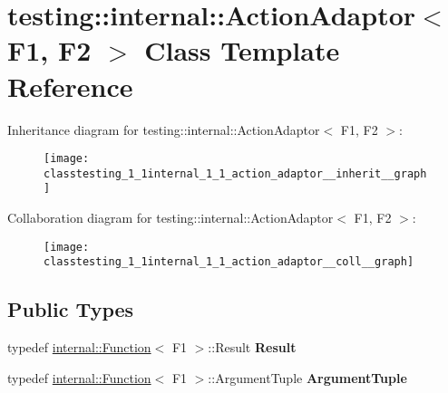 \hypertarget{classtesting_1_1internal_1_1_action_adaptor}{}\section{testing\+:\+:internal\+:\+:Action\+Adaptor$<$ F1, F2 $>$ Class Template Reference}
\label{classtesting_1_1internal_1_1_action_adaptor}


Inheritance diagram for testing\+:\+:internal\+:\+:Action\+Adaptor$<$ F1, F2 $>$\+:
\nopagebreak
\begin{figure}[H]
\begin{center}
\leavevmode
\texttt{[image: classtesting\_1\_1internal\_1\_1\_action\_adaptor\_\_inherit\_\_graph]}
\end{center}
\end{figure}


Collaboration diagram for testing\+:\+:internal\+:\+:Action\+Adaptor$<$ F1, F2 $>$\+:
\nopagebreak
\begin{figure}[H]
\begin{center}
\leavevmode
\texttt{[image: classtesting\_1\_1internal\_1\_1\_action\_adaptor\_\_coll\_\_graph]}
\end{center}
\end{figure}
\subsection*{Public Types}
\begin{DoxyCompactItemize}
\item 
\mbox{\label{classtesting_1_1internal_1_1_action_adaptor_afa8f7872b6db3d8f1545fd98b45b0b95}} 
typedef \hyperlink{structtesting_1_1internal_1_1_function}{internal\+::\+Function}$<$ F1 $>$\+::Result {\bfseries Result}
\item 
\mbox{\label{classtesting_1_1internal_1_1_action_adaptor_a4f78fb73f97b72fea8a93b78a8ab5704}} 
typedef \hyperlink{structtesting_1_1internal_1_1_function}{internal\+::\+Function}$<$ F1 $>$\+::Argument\+Tuple {\bfseries Argument\+Tuple}
\end{DoxyCompactItemize}
